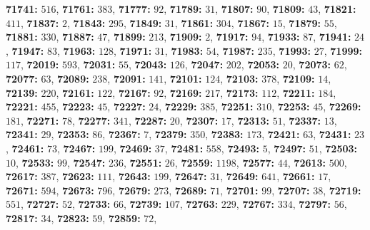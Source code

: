 \textsf{\bfseries 71741:} $516$, \textsf{\bfseries 71761:} $383$, \textsf{\bfseries 71777:} $92$, \textsf{\bfseries 71789:} $31$, \textsf{\bfseries 71807:} $90$, \textsf{\bfseries 71809:} $43$, \textsf{\bfseries 71821:} $411$, \textsf{\bfseries 71837:} $2$, \textsf{\bfseries 71843:} $295$, \textsf{\bfseries 71849:} $31$, \textsf{\bfseries 71861:} $304$, \textsf{\bfseries 71867:} $15$, \textsf{\bfseries 71879:} $55$, \textsf{\bfseries 71881:} $330$, \textsf{\bfseries 71887:} $47$, \textsf{\bfseries 71899:} $213$, \textsf{\bfseries 71909:} $2$, \textsf{\bfseries 71917:} $94$, \textsf{\bfseries 71933:} $87$, \textsf{\bfseries 71941:} $24$, \textsf{\bfseries 71947:} $83$, \textsf{\bfseries 71963:} $128$, \textsf{\bfseries 71971:} $31$, \textsf{\bfseries 71983:} $54$, \textsf{\bfseries 71987:} $235$, \textsf{\bfseries 71993:} $27$, \textsf{\bfseries 71999:} $117$, \textsf{\bfseries 72019:} $593$, \textsf{\bfseries 72031:} $55$, \textsf{\bfseries 72043:} $126$, \textsf{\bfseries 72047:} $202$, \textsf{\bfseries 72053:} $20$, \textsf{\bfseries 72073:} $62$, \textsf{\bfseries 72077:} $63$, \textsf{\bfseries 72089:} $238$, \textsf{\bfseries 72091:} $141$, \textsf{\bfseries 72101:} $124$, \textsf{\bfseries 72103:} $378$, \textsf{\bfseries 72109:} $14$, \textsf{\bfseries 72139:} $220$, \textsf{\bfseries 72161:} $122$, \textsf{\bfseries 72167:} $92$, \textsf{\bfseries 72169:} $217$, \textsf{\bfseries 72173:} $112$, \textsf{\bfseries 72211:} $184$, \textsf{\bfseries 72221:} $455$, \textsf{\bfseries 72223:} $45$, \textsf{\bfseries 72227:} $24$, \textsf{\bfseries 72229:} $385$, \textsf{\bfseries 72251:} $310$, \textsf{\bfseries 72253:} $45$, \textsf{\bfseries 72269:} $181$, \textsf{\bfseries 72271:} $78$, \textsf{\bfseries 72277:} $341$, \textsf{\bfseries 72287:} $20$, \textsf{\bfseries 72307:} $17$, \textsf{\bfseries 72313:} $51$, \textsf{\bfseries 72337:} $13$, \textsf{\bfseries 72341:} $29$, \textsf{\bfseries 72353:} $86$, \textsf{\bfseries 72367:} $7$, \textsf{\bfseries 72379:} $350$, \textsf{\bfseries 72383:} $173$, \textsf{\bfseries 72421:} $63$, \textsf{\bfseries 72431:} $23$, \textsf{\bfseries 72461:} $73$, \textsf{\bfseries 72467:} $199$, \textsf{\bfseries 72469:} $37$, \textsf{\bfseries 72481:} $558$, \textsf{\bfseries 72493:} $5$, \textsf{\bfseries 72497:} $51$, \textsf{\bfseries 72503:} $10$, \textsf{\bfseries 72533:} $99$, \textsf{\bfseries 72547:} $236$, \textsf{\bfseries 72551:} $26$, \textsf{\bfseries 72559:} $1198$, \textsf{\bfseries 72577:} $44$, \textsf{\bfseries 72613:} $500$, \textsf{\bfseries 72617:} $387$, \textsf{\bfseries 72623:} $111$, \textsf{\bfseries 72643:} $199$, \textsf{\bfseries 72647:} $31$, \textsf{\bfseries 72649:} $641$, \textsf{\bfseries 72661:} $17$, \textsf{\bfseries 72671:} $594$, \textsf{\bfseries 72673:} $796$, \textsf{\bfseries 72679:} $273$, \textsf{\bfseries 72689:} $71$, \textsf{\bfseries 72701:} $99$, \textsf{\bfseries 72707:} $38$, \textsf{\bfseries 72719:} $551$, \textsf{\bfseries 72727:} $52$, \textsf{\bfseries 72733:} $66$, \textsf{\bfseries 72739:} $107$, \textsf{\bfseries 72763:} $229$, \textsf{\bfseries 72767:} $334$, \textsf{\bfseries 72797:} $56$, \textsf{\bfseries 72817:} $34$, \textsf{\bfseries 72823:} $59$, \textsf{\bfseries 72859:} $72$, 
